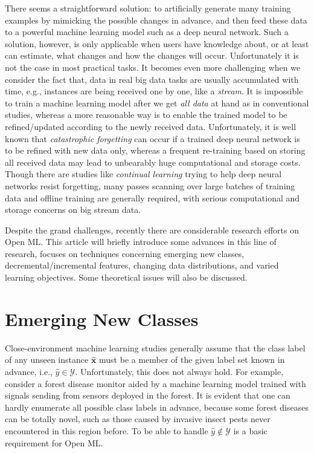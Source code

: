 \documentclass[review,11pt]{ReportTemplate}
\begin{document}
There seems a straightforward solution: to artificially generate many training examples by mimicking the possible changes in advance, and then feed these data to a powerful machine learning model such as a deep neural network. Such a solution, however, is only applicable when users have knowledge about, or at least can estimate, what changes and how the changes will occur. Unfortunately it is not the case in most practical tasks. It becomes even more challenging when we consider the fact that, data in real big data tasks are usually accumulated with time, e.g., instances are being received one by one, like a \textit{stream}. It is impossible to train a machine learning model after we get \textit{all data} at hand as in conventional studies, whereas a more reasonable way is to enable the trained model to be refined/updated according to the newly received data. Unfortunately, it is well known that \textit{catastrophic forgetting} \cite{Pfulb:Gepperth2019} can occur if a trained deep neural network is to be refined with new data only, whereas a frequent re-training based on storing all received data may lead to unbearably huge computational and storage costs. Though there are studies like \textit{continual learning} \cite{Delange:Aljundi:Masana2022} trying to help deep neural networks resist forgetting, many passes scanning over large batches of training data and offline training are generally required, with serious computational and storage concerns on big stream data.

Despite the grand challenges, recently there are considerable research efforts on Open ML. This article will briefly introduce some advances in this line of research, focuses on techniques concerning emerging new classes, decremental/incremental features, changing data distributions, and varied learning objectives. Some theoretical issues will also be discussed.


\section{Emerging New Classes}\label{sec:newclass}

Close-environment machine learning studies generally assume that the class label of any unseen instance $\hat{\bm{x}}$ must be a member of the given label set known in advance, i.e., $\hat{y} \in \mathcal{Y}$. Unfortunately, this does not always hold. For example, consider a forest disease monitor aided by a machine learning model trained with signals sending from sensors deployed in the forest. It is evident that one can hardly enumerate all possible class labels in advance, because some forest diseases can be totally novel, such as those caused by invasive insect pests never encountered in this region before. To be able to handle $\hat{y} \notin \mathcal{Y}$ is a basic requirement for Open ML.
\end{document}
